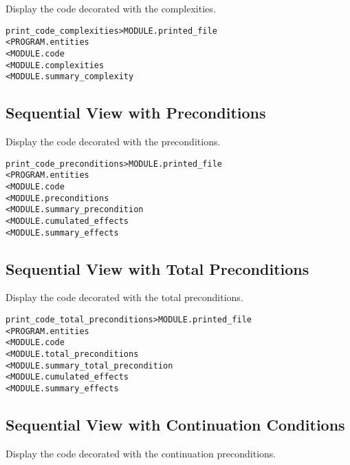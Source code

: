 \documentclass[a4paper]{report}
\newenvironment{PipsMake}{\begin{alltt}}{\end{alltt}}
\newenvironment{PipsPass}[1]{\label{pass:#1}}{}
\begin{document}
\begin{PipsPass}{print_code_complexities}
Display the code decorated with the complexities.
\end{PipsPass}

\begin{PipsMake}
print_code_complexities         > MODULE.printed_file
        < PROGRAM.entities
        < MODULE.code
        < MODULE.complexities
        < MODULE.summary_complexity
\end{PipsMake}

\subsection{Sequential View with Preconditions}

\begin{PipsPass}{print_code_preconditions}
Display the code decorated with the preconditions.
\end{PipsPass}

\begin{PipsMake}
print_code_preconditions        > MODULE.printed_file
        < PROGRAM.entities
        < MODULE.code
        < MODULE.preconditions
        < MODULE.summary_precondition
        < MODULE.cumulated_effects
        < MODULE.summary_effects
\end{PipsMake}

\subsection{Sequential View with Total Preconditions}

\begin{PipsPass}{print_code_total_preconditions}
Display the code decorated with the total preconditions.
\end{PipsPass}

\begin{PipsMake}
print_code_total_preconditions        > MODULE.printed_file
        < PROGRAM.entities
        < MODULE.code
        < MODULE.total_preconditions
        < MODULE.summary_total_precondition
        < MODULE.cumulated_effects
        < MODULE.summary_effects
\end{PipsMake}

\subsection{Sequential View with Continuation Conditions}

\begin{PipsPass}{print_code_continuation_conditions}
Display the code decorated with the continuation preconditions.
\end{PipsPass}
\end{document}
